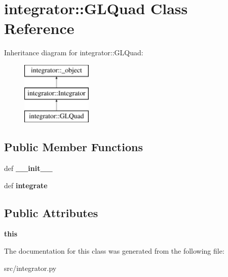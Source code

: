 \hypertarget{classintegrator_1_1GLQuad}{
\section{integrator::GLQuad Class Reference}
\label{d0/de8/classintegrator_1_1GLQuad}
}
Inheritance diagram for integrator::GLQuad:\begin{figure}[H]
\begin{center}
\leavevmode
\includegraphics[height=3cm]{d0/de8/classintegrator_1_1GLQuad}
\end{center}
\end{figure}
\subsection*{Public Member Functions}
\begin{DoxyCompactItemize}
\item 
\hypertarget{classintegrator_1_1GLQuad_af1c5b397ad095a34096db39e83602ec9}{
def {\bfseries \_\-\_\-init\_\-\_\-}}
\label{d0/de8/classintegrator_1_1GLQuad_af1c5b397ad095a34096db39e83602ec9}

\item 
\hypertarget{classintegrator_1_1GLQuad_a85a93767e974c0890fe49e3811209cb4}{
def {\bfseries integrate}}
\label{d0/de8/classintegrator_1_1GLQuad_a85a93767e974c0890fe49e3811209cb4}

\end{DoxyCompactItemize}
\subsection*{Public Attributes}
\begin{DoxyCompactItemize}
\item 
\hypertarget{classintegrator_1_1GLQuad_a613996b0a038da751fa6cf2753d921cd}{
{\bfseries this}}
\label{d0/de8/classintegrator_1_1GLQuad_a613996b0a038da751fa6cf2753d921cd}

\end{DoxyCompactItemize}


The documentation for this class was generated from the following file:\begin{DoxyCompactItemize}
\item 
src/integrator.py\end{DoxyCompactItemize}
